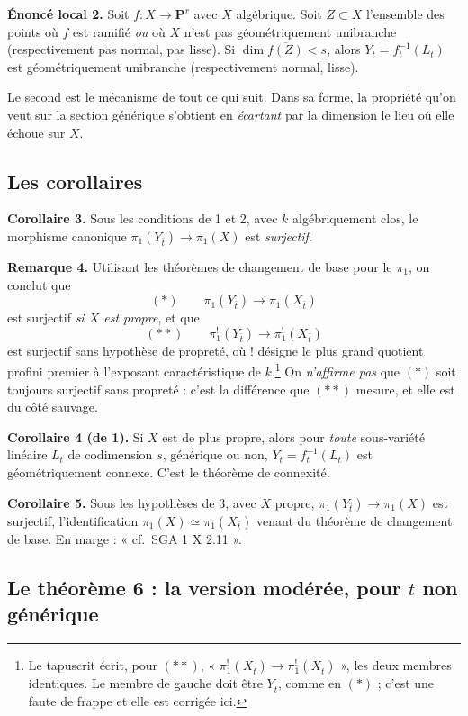 \documentclass[11pt,a4paper]{article}
\begin{document}
\textbf{Énoncé local 2.} Soit $f : X \to \mathbf{P}^{r}$ avec $X$ algébrique.
Soit $Z \subset X$ l'ensemble des points où $f$ est ramifié \emph{ou} où $X$
n'est pas géométriquement unibranche (respectivement pas normal, pas lisse).
Si $\dim \overline{f(Z)} < s$, alors $Y_{t} = f_{t}^{-1}(L_{t})$ est
géométriquement unibranche (respectivement normal, lisse).

Le second est le mécanisme de tout ce qui suit. Dans sa forme, la
propriété qu'on veut sur la section générique s'obtient en \emph{écartant} par
la dimension le lieu où elle échoue sur $X$.

\subsection*{Les corollaires}

\textbf{Corollaire 3.} Sous les conditions de 1 et 2, avec $k$ algébriquement
clos, le morphisme canonique $\pi_{1}(Y_{\bar{t}}) \to \pi_{1}(X)$ est
\emph{surjectif}.

\textbf{Remarque 4.} Utilisant les théorèmes de changement de base pour le
$\pi_{1}$, on conclut que
\[
  (\ast) \qquad \pi_{1}(Y_{\bar{t}}) \longrightarrow \pi_{1}(X_{\bar{t}})
\]
est surjectif \emph{si $X$ est propre}, et que
\[
  (\ast\ast) \qquad \pi_{1}^{!}(Y_{\bar{t}}) \longrightarrow
  \pi_{1}^{!}(X_{\bar{t}})
\]
est surjectif sans hypothèse de propreté, où $!$ désigne le plus grand quotient
profini premier à l'exposant caractéristique de $k$.\footnote{Le tapuscrit
écrit, pour $(\ast\ast)$, « $\pi_{1}^{!}(X_{\bar{t}}) \to
\pi_{1}^{!}(X_{\bar{t}})$ », les deux membres identiques. Le membre de gauche
doit être $Y_{\bar{t}}$, comme en $(\ast)$ ; c'est une faute de frappe et elle
est corrigée ici.} On \emph{n'affirme pas} que $(\ast)$ soit toujours surjectif
sans propreté : c'est la différence que $(\ast\ast)$ mesure, et elle
est du côté sauvage.

\textbf{Corollaire 4 (de 1).} Si $X$ est de plus propre, alors pour
\emph{toute} sous-variété linéaire $L_{t}$ de codimension $s$,
générique ou non, $Y_{t} = f_{t}^{-1}(L_{t})$ est géométriquement connexe.
C'est le théorème de connexité.

\textbf{Corollaire 5.} Sous les hypothèses de 3, avec $X$ propre,
$\pi_{1}(Y_{\bar{t}}) \to \pi_{1}(X)$ est surjectif, l'identification
$\pi_{1}(X) \simeq \pi_{1}(X_{\bar{t}})$ venant du théorème de changement de
base. En marge : « cf.\ SGA 1 X 2.11 ».

\subsection*{Le théorème 6 : la version modérée, pour $t$ non générique}
\end{document}
